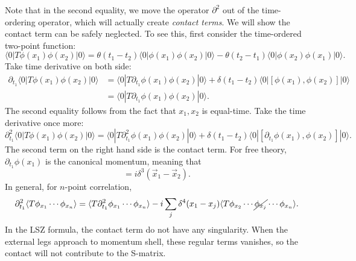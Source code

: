 \documentclass[aps,prb,superscriptaddress,nofootinbib]{revtex4}
\begin{document}
Note that in the second equality, we move the operator $\partial^2$ out of the time-ordering operator, which will actually create \textit{contact terms}.
We will show the contact term can be safely neglected.
To see this, first consider the time-ordered two-point function:
\begin{equation}
	\langle 0|T\phi(x_1)\phi(x_2)|0\rangle
	= \theta(t_1-t_2)\langle 0|\phi(x_1)\phi(x_2)|0\rangle -
	\theta(t_2-t_1)\langle 0|\phi(x_2)\phi(x_1)|0\rangle.
\end{equation}	
Take time derivative on both side:
\begin{equation*}
\begin{aligned}
	\partial_{t_1} \langle 0|T\phi(x_1)\phi(x_2)|0\rangle
	&= \langle 0|T\partial_{t_1}\phi(x_1)\phi(x_2)|0\rangle +
	\delta(t_1-t_2)\langle 0|[\phi(x_1),\phi(x_2)]|0\rangle \\
	&= \langle 0|T\partial_{t_1}\phi(x_1)\phi(x_2)|0\rangle.
\end{aligned}
\end{equation*}
The second equality follows from the fact that $x_1,x_2$ is equal-time.
Take the time derivative once more:
\begin{equation*}
	\partial^2_{t_1} \langle 0|T\phi(x_1)\phi(x_2)|0\rangle
	= \langle 0|T\partial^2_{t_1}\phi(x_1)\phi(x_2)|0\rangle +
	\delta(t_1-t_2)\langle 0|[\partial_{t_1}\phi(x_1),\phi(x_2)]|0\rangle.
\end{equation*}
The second term on the right hand side is the contact term.
For free theory, $\partial_{t_1}\phi(x_1)$ is the canonical momentum, meaning that
\begin{equation}
	[\phi(\vec x_1, t),\partial_{t}\phi(\vec x_1,t)] = i \delta^{3}(\vec x_1-\vec x_2).
\end{equation}
In general, for $n$-point correlation,
\begin{equation}
\begin{aligned}
	 \partial_{t_1}^2 \langle T\phi_{x_1}\cdots\phi_{x_n} \rangle
	= \langle T\partial_{t_1}^2\phi_{x_1}\cdots\phi_{x_n}\rangle -i \sum_j \delta^4(x_1-x_j) \langle T \phi_{x_2}\cdots\cancel{\phi_{x_j}}\cdots\phi_{x_n} \rangle.
\end{aligned}
\end{equation}
In the LSZ formula, the contact term do not have any singularity.
When the external legs approach to momentum shell, these regular terms vanishes, so the contact will not contribute to the S-matrix.
\end{document}
